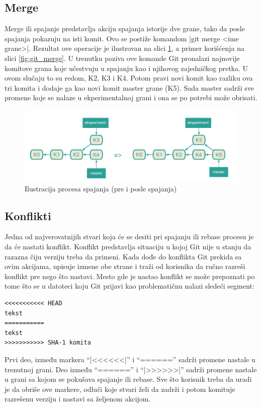\documentclass[a4paper]{article}
\begin{document}
{\subsection{Merge}
\label{subsec:merge}
Merge ili spajanje predstavlja akciju spajanja istorije dve grane, tako da posle spajanja pokazuju na isti komit. Ovo se postiže komandom |git merge <ime grane>|. Rezultat ove operacije je ilustrovan na slici \ref{fig:merge}, a primer korišćenja na slici \ref{fig:git_merge}. U trenutku poziva ove komande Git pronalazi najnovije komitove grana koje učestvuju u spajanju kao i njihovog zajedničkog pretka. U ovom slučaju to su redom, K2, K3 i K4. Potom pravi novi komit kao razliku ova tri komita i dodaje ga kao novi komit master grane (K5). Sada master sadrži sve promene koje se nalaze u ekperimentalnoj grani i ona se po potrebi može obrisati.
\begin{figure}[h!]
\begin{center}
\includegraphics[scale=0.3]{images/merge.png}
\end{center}
\caption{Ilustracija procesa spajanja (pre i posle spajanja)}
\label{fig:merge}
\end{figure}

\subsection{Konflikti}
\label{subsec:konflikti}
Jedna od najverovatnijih stvari koja će se desiti pri spajanju ili rebase procesu je da će nastati konflikt. Konflikt predstavlja situaciju u kojoj Git nije u stanju da razazna čiju verziju treba da primeni. Kada dođe do konflikta Git prekida sa ovim akcijama, upisuje izmene obe strane i traži od korisnika da ručno razreši konflikt pre nego što nastavi. Mesto gde je nastao konflikt se može prepoznati po tome što se u datoteci koju Git prijavi kao problematičnu nalazi sledeći segment:
\begin{lstlisting}
<<<<<<<<<<< HEAD
tekst
===========
tekst
>>>>>>>>>>> SHA-1 komita
\end{lstlisting}
Prvi deo, između markera ``|<<<<<<|'' i ``======'' sadrži promene nastale u trenutnoj grani. Deo između  ``======'' i ``|>>>>>>|'' sadrži promene nastale u grani sa kojom se pokušava spajanje ili rebase. Sve što korisnik treba da uradi je da obriše ove markere, odluči koje stvari želi da zadrži i potom komituje razrešenu verziju i nastavi sa željenom akcijom. \cite{resolving_conflicts}
}
\end{document}
